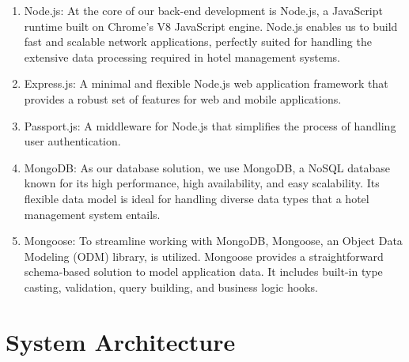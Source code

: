     \begin{enumerate}
        \item Node.js: At the core of our back-end development is Node.js, a JavaScript runtime built on Chrome's V8 JavaScript engine. Node.js enables us to build fast and scalable network applications, perfectly suited for handling the extensive data processing required in hotel management systems.
        \item Express.js: A minimal and flexible Node.js web application framework that provides a robust set of features for web and mobile applications.
        \item Passport.js: A middleware for Node.js that simplifies the process of handling user authentication.
        \item MongoDB: As our database solution, we use MongoDB, a NoSQL database known for its high performance, high availability, and easy scalability. Its flexible data model is ideal for handling diverse data types that a hotel management system entails.
        \item Mongoose: To streamline working with MongoDB, Mongoose, an Object Data Modeling (ODM) library, is utilized. Mongoose provides a straightforward schema-based solution to model application data. It includes built-in type casting, validation, query building, and business logic hooks.
        
    \end{enumerate}
    \section{System Architecture}
    